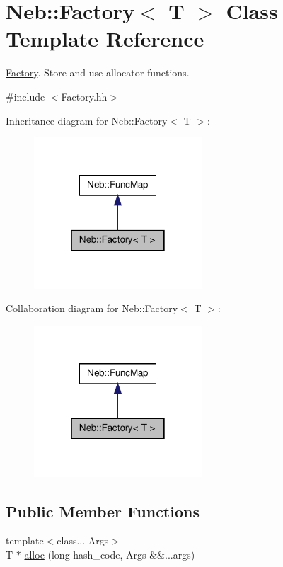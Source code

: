 \hypertarget{classNeb_1_1Factory}{\section{\-Neb\-:\-:\-Factory$<$ \-T $>$ \-Class \-Template \-Reference}
\label{classNeb_1_1Factory}
}


\hyperlink{classNeb_1_1Factory}{\-Factory}. \-Store and use allocator functions.  




{\ttfamily \#include $<$\-Factory.\-hh$>$}



\-Inheritance diagram for \-Neb\-:\-:\-Factory$<$ \-T $>$\-:\nopagebreak
\begin{figure}[H]
\begin{center}
\leavevmode
\includegraphics[width=178pt]{classNeb_1_1Factory__inherit__graph}
\end{center}
\end{figure}


\-Collaboration diagram for \-Neb\-:\-:\-Factory$<$ \-T $>$\-:\nopagebreak
\begin{figure}[H]
\begin{center}
\leavevmode
\includegraphics[width=178pt]{classNeb_1_1Factory__coll__graph}
\end{center}
\end{figure}
\subsection*{\-Public \-Member \-Functions}
\begin{DoxyCompactItemize}
\item 
{\footnotesize template$<$class... \-Args$>$ }\\\-T $\ast$ \hyperlink{classNeb_1_1Factory_ac499b39e795c35e0894811b2706d5c74}{alloc} (long hash\-\_\-code, \-Args \&\&...args)
\end{DoxyCompactItemize}


